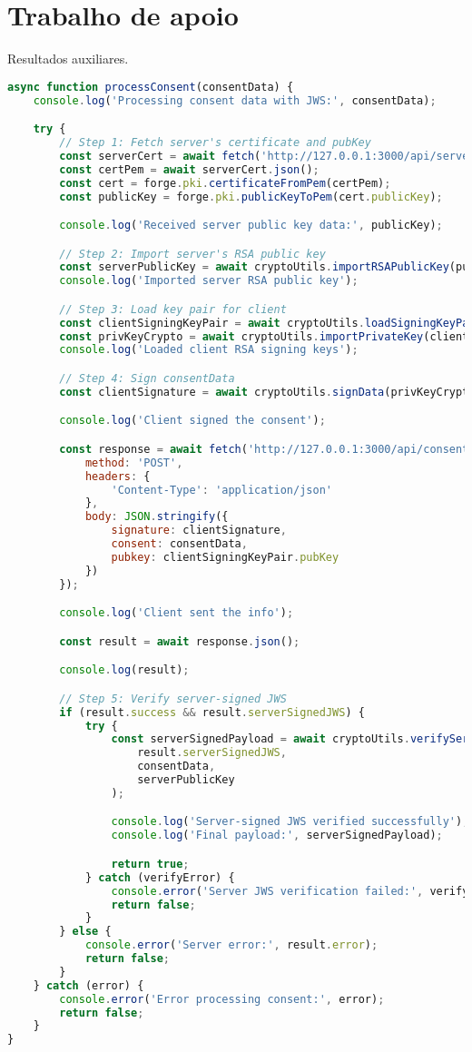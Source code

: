 \chapter{Trabalho de apoio}
Resultados auxiliares.

\begin{lstlisting}[language=Javascript]
async function processConsent(consentData) {
	console.log('Processing consent data with JWS:', consentData);

	try {
		// Step 1: Fetch server's certificate and pubKey
		const serverCert = await fetch('http://127.0.0.1:3000/api/server_certificate');
		const certPem = await serverCert.json();
		const cert = forge.pki.certificateFromPem(certPem);
		const publicKey = forge.pki.publicKeyToPem(cert.publicKey);

		console.log('Received server public key data:', publicKey);

		// Step 2: Import server's RSA public key
		const serverPublicKey = await cryptoUtils.importRSAPublicKey(publicKey);
		console.log('Imported server RSA public key');

		// Step 3: Load key pair for client
		const clientSigningKeyPair = await cryptoUtils.loadSigningKeyPair();
		const privKeyCrypto = await cryptoUtils.importPrivateKey(clientSigningKeyPair.privKey);
		console.log('Loaded client RSA signing keys');

		// Step 4: Sign consentData
		const clientSignature = await cryptoUtils.signData(privKeyCrypto, consentData);

		console.log('Client signed the consent');

		const response = await fetch('http://127.0.0.1:3000/api/consent', {
			method: 'POST',
			headers: {
				'Content-Type': 'application/json'
			},
			body: JSON.stringify({
				signature: clientSignature,
				consent: consentData,
				pubkey: clientSigningKeyPair.pubKey
			})
		});

		console.log('Client sent the info');

		const result = await response.json();

		console.log(result);

		// Step 5: Verify server-signed JWS
		if (result.success && result.serverSignedJWS) {
			try {
				const serverSignedPayload = await cryptoUtils.verifyServerJWS(
					result.serverSignedJWS,
					consentData,
					serverPublicKey
				);

				console.log('Server-signed JWS verified successfully');
				console.log('Final payload:', serverSignedPayload);

				return true;
			} catch (verifyError) {
				console.error('Server JWS verification failed:', verifyError);
				return false;
			}
		} else {
			console.error('Server error:', result.error);
			return false;
		}
	} catch (error) {
		console.error('Error processing consent:', error);
		return false;
	}
}
\end{lstlisting}
\label{apendice:process-consent}
